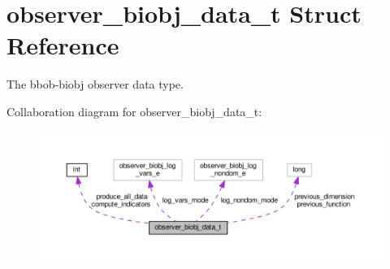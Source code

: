 \hypertarget{structobserver__biobj__data__t}{}\section{observer\+\_\+biobj\+\_\+data\+\_\+t Struct Reference}
\label{structobserver__biobj__data__t}


The bbob-\/biobj observer data type.  




Collaboration diagram for observer\+\_\+biobj\+\_\+data\+\_\+t\+:\nopagebreak
\begin{figure}[H]
\begin{center}
\leavevmode
\includegraphics[width=350pt]{structobserver__biobj__data__t__coll__graph}
\end{center}
\end{figure}
